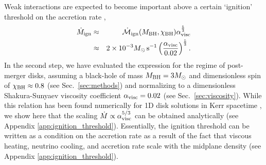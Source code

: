 Weak interactions are expected to become important above a certain `ignition' threshold on the accretion rate \cite{chen_neutrino-cooled_2007,metzger_time-dependent_2008},
\begin{eqnarray}
    \dot{M}_{\rm ign} &\approx& \dot{\mathcal{M}}_{\rm ign}(M_{\rm BH},\chi_{\rm BH})\alpha_{\rm visc}^{\frac{5}{3}} \label{eq:Mdot_ign}\\ 
    &\approx& 2\times 10^{-3} M_\odot \,\text{s}^{-1} \left(\frac{\alpha_{\rm visc}}{0.02}\right)^{\frac{5}{3}} \label{eq:Mdot_ign_merger}.  
\end{eqnarray}
In the second step, we have evaluated the expression for the regime of post-merger disks, assuming a black-hole of mass $M_{\rm BH}=3M_\odot$ and dimensionless spin of $\chi_{\rm BH}\approx 0.8$ (see Sec.~\ref{sec:methods}) and normalizing to a dimensionless Shakura-Sunyaev viscosity coefficient $\alpha_{\rm visc} = 0.02$ (see Sec.~\ref{sec:viscosity}). While this relation has been found numerically for 1D disk solutions in Kerr spacetime \cite{chen_neutrino-cooled_2007}, we show here that the scaling $\dot{M}\propto \alpha_{\rm visc}^{5/3}$ can be obtained analytically (see Appendix \ref{app:ignition_threshold}). Essentially, the ignition threshold can be written as a condition on the accretion rate as a result of the fact that viscous heating, neutrino cooling, and accretion rate scale with the midplane density (see Appendix \ref{app:ignition_threshold}).

